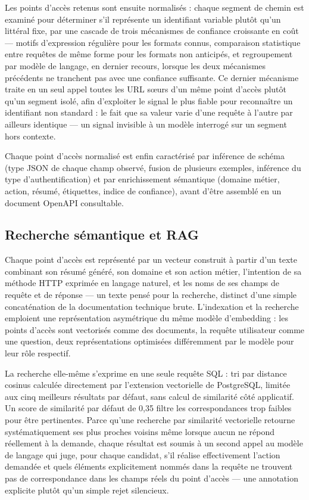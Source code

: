 Les points d'accès retenus sont ensuite normalisés : chaque segment de chemin est examiné pour déterminer s'il représente un identifiant variable plutôt qu'un littéral fixe, par une cascade de trois mécanismes de confiance croissante en coût — motifs d'expression régulière pour les formats connus, comparaison statistique entre requêtes de même forme pour les formats non anticipés, et regroupement par modèle de langage, en dernier recours, lorsque les deux mécanismes précédents ne tranchent pas avec une confiance suffisante. Ce dernier mécanisme traite en un seul appel toutes les URL sœurs d'un même point d'accès plutôt qu'un segment isolé, afin d'exploiter le signal le plus fiable pour reconnaître un identifiant non standard : le fait que sa valeur varie d'une requête à l'autre par ailleurs identique — un signal invisible à un modèle interrogé sur un segment hors contexte.

Chaque point d'accès normalisé est enfin caractérisé par inférence de schéma (type JSON de chaque champ observé, fusion de plusieurs exemples, inférence du type d'authentification) et par enrichissement sémantique (domaine métier, action, résumé, étiquettes, indice de confiance), avant d'être assemblé en un document OpenAPI consultable.

\subsection{Recherche sémantique et RAG}

Chaque point d'accès est représenté par un vecteur construit à partir d'un texte combinant son résumé généré, son domaine et son action métier, l'intention de sa méthode HTTP exprimée en langage naturel, et les noms de ses champs de requête et de réponse — un texte pensé pour la recherche, distinct d'une simple concaténation de la documentation technique brute. L'indexation et la recherche emploient une représentation asymétrique du même modèle d'embedding : les points d'accès sont vectorisés comme des documents, la requête utilisateur comme une question, deux représentations optimisées différemment par le modèle pour leur rôle respectif.

La recherche elle-même s'exprime en une seule requête SQL : tri par distance cosinus calculée directement par l'extension vectorielle de PostgreSQL, limitée aux cinq meilleurs résultats par défaut, sans calcul de similarité côté applicatif. Un score de similarité par défaut de 0,35 filtre les correspondances trop faibles pour être pertinentes. Parce qu'une recherche par similarité vectorielle retourne systématiquement ses plus proches voisins même lorsque aucun ne répond réellement à la demande, chaque résultat est soumis à un second appel au modèle de langage qui juge, pour chaque candidat, s'il réalise effectivement l'action demandée et quels éléments explicitement nommés dans la requête ne trouvent pas de correspondance dans les champs réels du point d'accès — une annotation explicite plutôt qu'un simple rejet silencieux.

